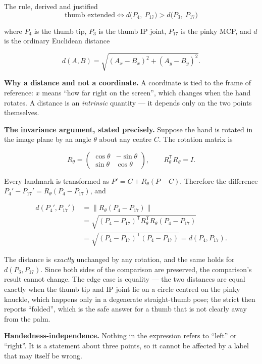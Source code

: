 \begin{mathdeepdive}{The rule, derived and justified}
$$\text{thumb extended} \iff d\big(P_4,\ P_{17}\big) > d\big(P_3,\ P_{17}\big)$$

where $P_4$ is the thumb tip, $P_3$ is the thumb IP joint, $P_{17}$ is the pinky MCP, and $d$ is the
ordinary Euclidean distance

$$d(A,B) = \sqrt{(A_x - B_x)^2 + (A_y - B_y)^2}.$$

\textbf{Why a distance and not a coordinate.} A coordinate is tied to the frame of reference: $x$
means ``how far right on the screen'', which changes when the hand rotates. A distance is an
\emph{intrinsic} quantity --- it depends only on the two points themselves.

\textbf{The invariance argument, stated precisely.} Suppose the hand is rotated in the image plane by
an angle $\theta$ about any centre $C$. The rotation matrix is

$$R_\theta = \begin{pmatrix} \cos\theta & -\sin\theta \\ \sin\theta & \cos\theta \end{pmatrix},
\qquad R_\theta^{\mathsf T} R_\theta = I.$$

Every landmark is transformed as $P' = C + R_\theta (P - C)$. Therefore the difference
$P_4' - P_{17}' = R_\theta (P_4 - P_{17})$, and

\begin{align*}
d(P_4', P_{17}') &= \big\| R_\theta (P_4 - P_{17}) \big\| \\
                 &= \sqrt{(P_4-P_{17})^{\mathsf T} R_\theta^{\mathsf T} R_\theta (P_4-P_{17})} \\
                 &= \sqrt{(P_4-P_{17})^{\mathsf T} (P_4-P_{17})} = d(P_4, P_{17}).
\end{align*}

The distance is \emph{exactly} unchanged by any rotation, and the same holds for $d(P_3, P_{17})$.
Since both sides of the comparison are preserved, the comparison's result cannot change. The edge
case is equality --- the two distances are equal exactly when the thumb tip and IP joint lie on a
circle centred on the pinky knuckle, which happens only in a degenerate straight-thumb pose; the
strict \code{>} then reports ``folded'', which is the safe answer for a thumb that is not clearly
away from the palm.

\textbf{Handedness-independence.} Nothing in the expression refers to ``left'' or ``right''. It is a
statement about three points, so it cannot be affected by a label that may itself be wrong.
\end{mathdeepdive}

